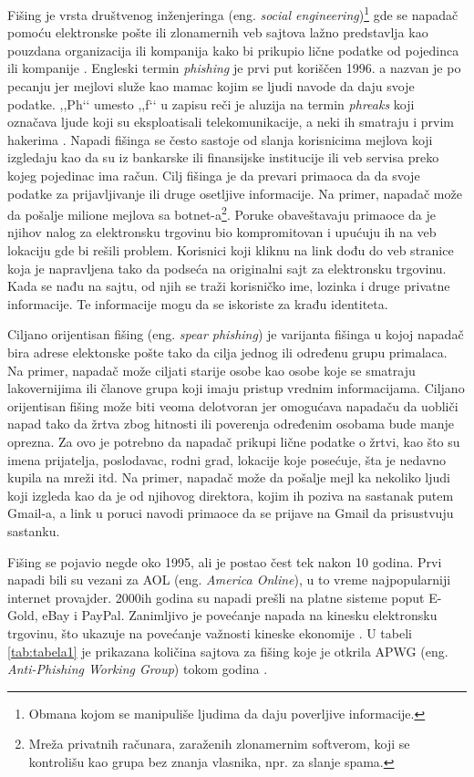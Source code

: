 \documentclass[a4paper]{article}
\theoremstyle{break}
\begin{document}
{Fišing je vrsta društvenog inženjeringa (eng. {\em social engineering})\footnote{Obmana kojom se manipuliše ljudima da daju poverljive informacije.} gde se napadač pomoću elektronske pošte ili zlonamernih veb sajtova lažno predstavlja kao pouzdana organizacija ili kompanija kako bi prikupio lične podatke od pojedinca ili kompanije \cite{phishing_us_cert}. Engleski termin {\em  phishing} je prvi put koriščen 1996. a nazvan je po pecanju jer mejlovi služe kao mamac kojim se ljudi navode da daju svoje podatke. ,,Ph‘‘ umesto ,,f‘‘ u zapisu reči je aluzija na termin {\em phreaks} koji označava ljude koji su eksploatisali telekomunikacije, a neki ih smatraju i prvim hakerima \cite{phishing_org}.
Napadi fišinga se često sastoje od slanja korisnicima mejlova koji izgledaju kao da su iz bankarske ili finansijske institucije ili veb servisa preko kojeg pojedinac ima račun. Cilj fišinga je da prevari primaoca da da svoje podatke za prijavljivanje ili druge osetljive informacije. 
Na primer, napadač može da pošalje milione mejlova sa botnet-a\footnote{Mreža privatnih računara, zaraženih zlonamernim softverom, koji se kontrolišu kao grupa bez znanja vlasnika, npr. za slanje spama.}. Poruke obaveštavaju primaoce da je njihov nalog za elektronsku trgovinu bio kompromitovan i upućuju ih na veb lokaciju gde bi rešili problem. Korisnici koji kliknu na link dođu do veb stranice koja je napravljena tako da podseća na originalni sajt za elektronsku trgovinu. Kada se nađu na sajtu, od njih se traži korisničko ime, lozinka i druge privatne informacije. Te informacije mogu da se iskoriste za krađu identiteta.

Ciljano orijentisan fišing (eng. {\em spear phishing}) je varijanta fišinga u kojoj napadač bira adrese elektonske pošte tako da cilja jednog ili određenu grupu primalaca. Na primer, napadač može ciljati starije osobe kao osobe koje se smatraju lakovernijima ili članove grupa koji imaju pristup vrednim informacijama. Ciljano orijentisan fišing može biti veoma delotvoran jer omogućava napadaču da uobliči napad tako da žrtva zbog hitnosti ili poverenja određenim osobama bude manje oprezna. Za ovo je potrebno da napadač prikupi lične podatke o žrtvi, kao što su imena prijatelja, poslodavac, rodni grad, lokacije koje posećuje, šta je nedavno kupila na mreži itd.
Na primer, napadač može da pošalje mejl ka nekoliko ljudi koji izgleda kao da je od njihovog direktora, kojim ih poziva na sastanak putem Gmail-a, a link u poruci navodi primaoce da se prijave na Gmail da prisustvuju sastanku. 

Fišing se pojavio negde oko 1995, ali je postao čest tek nakon 10 godina. Prvi napadi bili su vezani za AOL (eng. {\em America Online}), u to vreme najpopularniji internet provajder\cite {phishing_aol}. 2000ih godina su napadi prešli na platne sisteme poput E-Gold, eBay i PayPal.
Zanimljivo je povećanje napada na kinesku elektronsku trgovinu, što ukazuje na povećanje važnosti kineske ekonomije \cite{knjiga}.
U tabeli \ref{tab:tabela1} je prikazana količina sajtova za fišing koje je otkrila APWG (eng. {\em Anti-Phishing Working Group}) tokom godina \cite{apwg}.

}
\end{document}
